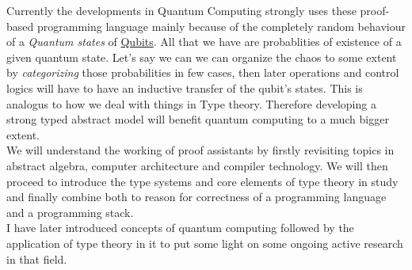 Currently the developments in Quantum Computing strongly uses these proof-based programming language mainly because of the completely random behaviour of a \textit{Quantum states} of \underline{Qubits}. All that we have are probablities of 
existence of a given quantum state. Let's say we can we can organize the chaos to some extent by \textit{categorizing} those probabilities in few cases, then later operations and control logics will have to have an inductive transfer of the qubit's states. This is analogus to how we deal with things in Type theory. Therefore developing a strong typed abstract model will benefit quantum computing to a much bigger extent.\\

We will understand the working of proof assistants by firstly revisiting topics in abstract algebra, computer architecture and compiler technology. We will then proceed to introduce the type systems and core elements of type theory in study and finally combine both to reason for correctness of a programming language and a programming stack.\\

I have later introduced concepts of quantum computing followed by the application of type theory in it to put some light on some ongoing active research in that field.\\
